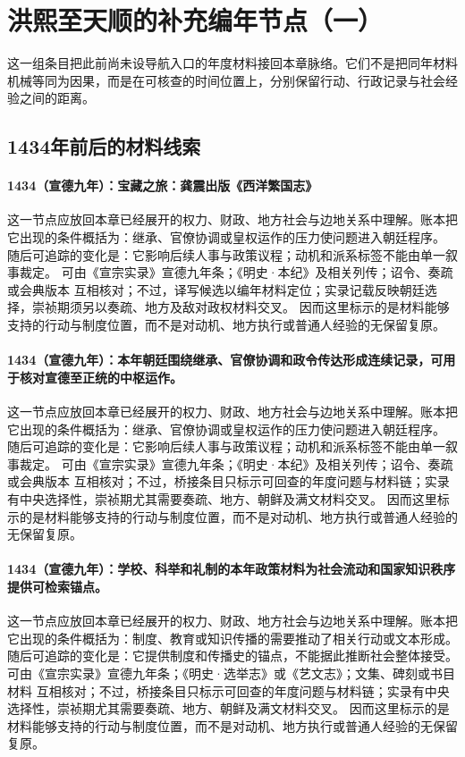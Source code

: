 \section{洪熙至天顺的补充编年节点（一）}
这一组条目把此前尚未设导航入口的年度材料接回本章脉络。它们不是把同年材料机械等同为因果，而是在可核查的时间位置上，分别保留行动、行政记录与社会经验之间的距离。

\subsection{1434年前后的材料线索}

\paragraph{1434（宣德九年）：宝藏之旅：龚震出版《西洋繁国志》} 这一节点应放回本章已经展开的权力、财政、地方社会与边地关系中理解。账本把它出现的条件概括为：继承、官僚协调或皇权运作的压力使问题进入朝廷程序。 随后可追踪的变化是：它影响后续人事与政策议程；动机和派系标签不能由单一叙事裁定。 可由《宣宗实录》宣德九年条；《明史·本纪》及相关列传；诏令、奏疏或会典版本 互相核对；不过，译写候选以编年材料定位；实录记载反映朝廷选择，崇祯期须另以奏疏、地方及敌对政权材料交叉。 因而这里标示的是材料能够支持的行动与制度位置，而不是对动机、地方执行或普通人经验的无保留复原。

\paragraph{1434（宣德九年）：本年朝廷围绕继承、官僚协调和政令传达形成连续记录，可用于核对宣德至正统的中枢运作。} 这一节点应放回本章已经展开的权力、财政、地方社会与边地关系中理解。账本把它出现的条件概括为：继承、官僚协调或皇权运作的压力使问题进入朝廷程序。 随后可追踪的变化是：它影响后续人事与政策议程；动机和派系标签不能由单一叙事裁定。 可由《宣宗实录》宣德九年条；《明史·本纪》及相关列传；诏令、奏疏或会典版本 互相核对；不过，桥接条目只标示可回查的年度问题与材料链；实录有中央选择性，崇祯期尤其需要奏疏、地方、朝鲜及满文材料交叉。 因而这里标示的是材料能够支持的行动与制度位置，而不是对动机、地方执行或普通人经验的无保留复原。

\paragraph{1434（宣德九年）：学校、科举和礼制的本年政策材料为社会流动和国家知识秩序提供可检索锚点。} 这一节点应放回本章已经展开的权力、财政、地方社会与边地关系中理解。账本把它出现的条件概括为：制度、教育或知识传播的需要推动了相关行动或文本形成。 随后可追踪的变化是：它提供制度和传播史的锚点，不能据此推断社会整体接受。 可由《宣宗实录》宣德九年条；《明史·选举志》或《艺文志》；文集、碑刻或书目材料 互相核对；不过，桥接条目只标示可回查的年度问题与材料链；实录有中央选择性，崇祯期尤其需要奏疏、地方、朝鲜及满文材料交叉。 因而这里标示的是材料能够支持的行动与制度位置，而不是对动机、地方执行或普通人经验的无保留复原。


